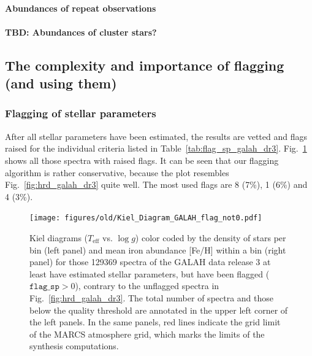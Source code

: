 \documentclass[fleqn,usenatbib,useAMS]{mnras}
\begin{document}
\paragraph*{Abundances of repeat observations}

\paragraph*{TBD: Abundances of cluster stars?}

\subsection{The complexity and importance of flagging (and using them)}

\subsubsection{Flagging of stellar parameters}

After all stellar parameters have been estimated, the results are vetted and flags raised for the individual criteria listed in Table~\ref{tab:flag_sp_galah_dr3}. Fig.~\ref{fig:hrd_galah_dr3_not0} shows all those spectra with raised flags. It can be seen that our flagging algorithm is rather conservative, because the plot resembles Fig.~\ref{fig:hrd_galah_dr3} quite well. The most used flags are 8 (7\%), 1 (6\%) and 4 (3\%). 

\begin{figure}
\centering
\texttt{[image: figures/old/Kiel\_Diagram\_GALAH\_flag\_not0.pdf]}
\caption[{Kiel diagrams ($T_\text{eff}$ vs. $\log g$) color coded by the density of stars per bin (left panel) and mean iron abundance [Fe/H] within a bin (right panel) for those stars of the GALAH data release 3 at least have estimated stellar parameters, but have been flagged ($\texttt{flag\_sp} > 0$).}]{Kiel diagrams ($T_\text{eff}$ vs. $\log g$) color coded by the density of stars per bin (left panel) and mean iron abundance [Fe/H] within a bin (right panel) for those 129369 spectra of the GALAH data release 3 at least have estimated stellar parameters, but have been flagged ($\texttt{flag\_sp} > 0$), contrary to the unflagged spectra in Fig.~\ref{fig:hrd_galah_dr3}. The total number of spectra and those below the quality threshold are annotated in the upper left corner of the left panels. In the same panels, red lines indicate the grid limit of the MARCS atmosphere grid, which marks the limits of the synthesis computations.}
\label{fig:hrd_galah_dr3_not0}
\end{figure}
\end{document}

